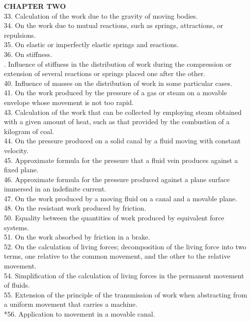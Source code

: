 \documentclass{book}
\begin{document}
\textbf{CHAPTER TWO} \\
33. Calculation of the work due to the gravity of moving bodies. \\
34. On the work due to mutual reactions, such as springs, attractions, or repulsions. \\
35. On elastic or imperfectly elastic springs and reactions. \\
36. On stiffness. \\
. Influence of stiffness in the distribution of work during the compression or extension of several reactions or springs placed one after the other. \\
40. Influence of masses on the distribution of work in some particular cases. \\
41. On the work produced by the pressure of a gas or steam on a movable envelope whose movement is not too rapid. \\
43. Calculation of the work that can be collected by employing steam obtained with a given amount of heat, such as that provided by the combustion of a kilogram of coal. \\
44. On the pressure produced on a solid canal by a fluid moving with constant velocity. \\
45. Approximate formula for the pressure that a fluid vein produces against a fixed plane. \\
46. Approximate formula for the pressure produced against a plane surface immersed in an indefinite current. \\
47. On the work produced by a moving fluid on a canal and a movable plane. \\
48. On the resistant work produced by friction. \\
50. Equality between the quantities of work produced by equivalent force systems. \\
51. On the work absorbed by friction in a brake. \\
52. On the calculation of living forces; decomposition of the living force into two terms, one relative to the common movement, and the other to the relative movement. \\
54. Simplification of the calculation of living forces in the permanent movement of fluids. \\
55. Extension of the principle of the transmission of work when abstracting from a uniform movement that carries a machine. \\
*56. Application to movement in a movable canal. \\
\end{document}
